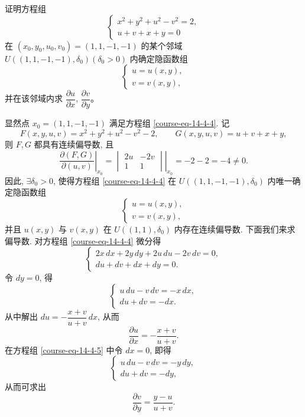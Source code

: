 \documentclass[12pt,fontset=fandol]{ctexart}
\begin{document}
\begin{example}\label{course-example-14-4-3}\quad 证明方程组
\begin{equation}
  \begin{cases}
    x^2+y^2+u^2-v^2=2,\\
    u+v+x+y=0
  \end{cases}
  \label{course-eq-14-4-4}
\end{equation}
在 $(x_0,y_0,u_0,v_0)=(1,1,-1,-1)$ 的某个邻域 $U((1,1,-1,-1),\delta_0)(\delta_0>0)$ 内确定隐函数组
\[
  \begin{cases}
    u=u(x,y),\\
    v=v(x,y),
  \end{cases}
\]
并在该邻域内求 $\dfrac{\partial u}{\partial x}$, $\dfrac{\partial v}{\partial y}$。

\end{example}
\begin{solve}\quad 显然点 $x_0=(1,1,-1,-1)$ 满足方程组 \eqref{course-eq-14-4-4}. 记
\[
  F(x,y,u,v)=x^2+y^2+u^2-v^2-2,
  \qquad
  G(x,y,u,v)=u+v+x+y,
\]
则 $F,G$ 都具有连续偏导数, 且
\[
  \left.
  \frac{\partial(F,G)}{\partial(u,v)}
  \right|_{x_0}
  =
  \left.
  \begin{vmatrix}
    2u & -2v\\
    1 & 1
  \end{vmatrix}
  \right|_{x_0}
  =-2-2=-4\ne0.
\]
因此, $\exists\delta_0>0$, 使得方程组 \eqref{course-eq-14-4-4}  在 $U((1,1,-1,-1),\delta_0)$ 内唯一确定隐函数组
\[
  \begin{cases}
    u=u(x,y),\\
    v=v(x,y),
  \end{cases}
\]
并且 $u(x,y)$ 与 $v(x,y)$ 在 $U((1,1),\delta_0)$ 内存在连续偏导数. 下面我们来求偏导数. 对方程组 \eqref{course-eq-14-4-4}  微分得
\begin{equation}
  \begin{cases}
    2x\,dx+2y\,dy+2u\,du-2v\,dv=0,\\
    du+dv+dx+dy=0.
  \end{cases}
  \label{course-eq-14-4-5}
\end{equation}
令 $dy=0$, 得
\[
  \begin{cases}
    u\,du-v\,dv=-x\,dx,\\
    du+dv=-dx.
  \end{cases}
\]
从中解出 $du=-\dfrac{x+v}{u+v}\,dx$, 从而
\[
  \frac{\partial u}{\partial x}=-\frac{x+v}{u+v}.
\]
在方程组 \eqref{course-eq-14-4-5}  中令 $dx=0$, 即得
\[
  \begin{cases}
    u\,du-v\,dv=-y\,dy,\\
    du+dv=-dy,
  \end{cases}
\]
从而可求出
\[
  \frac{\partial v}{\partial y}=\frac{y-u}{u+v}.
\]

\end{solve}
\end{document}
